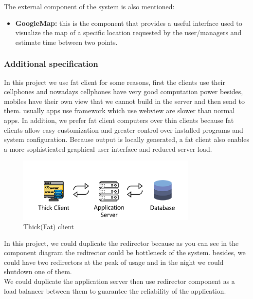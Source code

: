 The external component of the system is also mentioned:
\begin{itemize}
    \item \textbf{GoogleMap:} this is the component that provides a useful interface used to visualize the map of a specific location requested by the user/managers and estimate time between two points.
\end{itemize}

\subsubsection{Additional specification}
\vspace{0.5cm}
In this project we use fat client for some reasons, first the clients use their cellphones and nowadays cellphones have very good computation power besides, mobiles have their own view that we cannot build in the server and then send to them. usually apps use framework which use webview are slower than normal apps. In addition, we prefer fat client computers over thin clients because fat clients allow easy customization and greater control over installed programs and system configuration. Because output is locally generated, a fat client also enables a more sophisticated graphical user interface and reduced server load.\\
\begin{figure}[H]
  \centering
  \includegraphics[width=0.8\textwidth,keepaspectratio]{images/all/thickclient.png}
  \caption{Thick(Fat) client}
\end{figure}
In this project, we could duplicate the redirector because as you can see in the component diagram the redirector could be bottleneck of the system. besides, we could have two redirectors at the peak of usage and in the night we could shutdown one of them.\\
We could duplicate the application server then use redirector component as a load balancer between them to guarantee the reliability of the application.
\clearpage